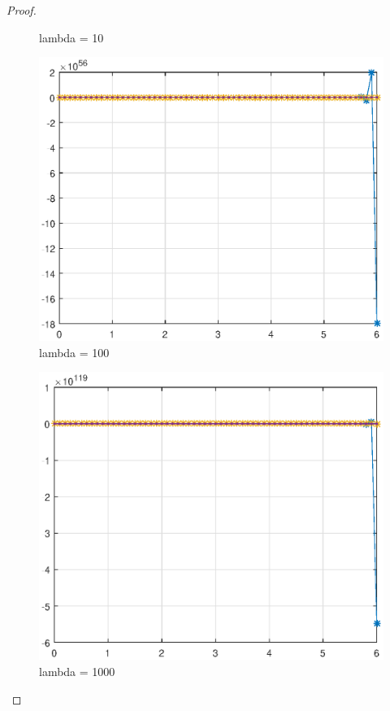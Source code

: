 \documentclass{article}
\begin{document}
\begin{proof}
\begin{figure}[htbp]
\caption{lambda = 10}
\label{Lambda2}
\end{figure}
\begin{figure}[htbp]
\centering
\includegraphics[width = 15cm]{lambda=100.eps}
\caption{lambda = 100}
\label{Lambda3}
\end{figure}
\begin{figure}[htbp]
\centering
\includegraphics[width = 15cm]{lambda=1000.eps}
\caption{lambda = 1000}
\label{Lambda4}
\end{figure}


\end{proof}
\end{document}
